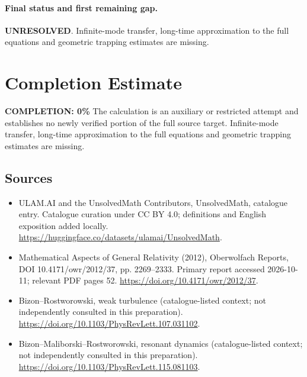 \documentclass[11pt]{article}
\begin{document}
\paragraph{Final status and first remaining gap.}
\textbf{UNRESOLVED}. Infinite-mode transfer, long-time approximation to the full equations and geometric trapping estimates are missing.

\section{Completion Estimate}
\noindent\textbf{COMPLETION: 0\%}
The calculation is an auxiliary or restricted attempt and establishes no newly verified portion of the full source target. Infinite-mode transfer, long-time approximation to the full equations and geometric trapping estimates are missing.

\subsection{Sources}
\begin{itemize}
\item[\hypertarget{source:statement:1}{S1}] ULAM.AI and the UnsolvedMath Contributors, UnsolvedMath, catalogue entry. Catalogue curation under CC BY 4.0; definitions and English exposition added locally.
\url{https://huggingface.co/datasets/ulamai/UnsolvedMath}.
\item[\hypertarget{source:statement:2}{S2}] Mathematical Aspects of General Relativity (2012), Oberwolfach Reports, DOI 10.4171/owr/2012/37, pp. 2269--2333. Primary report accessed 2026-10-11; relevant PDF pages 52.
\url{https://doi.org/10.4171/owr/2012/37}.
\item[\hypertarget{source:statement:3}{S3}] Bizon--Rostworowski, weak turbulence (catalogue-listed context; not independently consulted in this preparation).
\url{https://doi.org/10.1103/PhysRevLett.107.031102}.
\item[\hypertarget{source:statement:4}{S4}] Bizon--Maliborski--Rostworowski, resonant dynamics (catalogue-listed context; not independently consulted in this preparation).
\url{https://doi.org/10.1103/PhysRevLett.115.081103}.
\end{itemize}
\label{end:statement}
\end{document}
